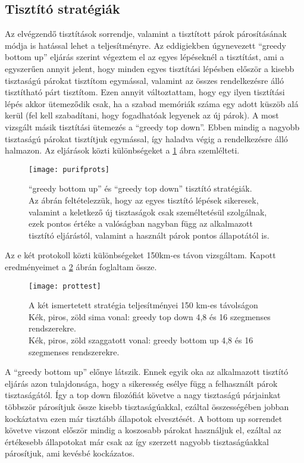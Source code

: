 \subsection{Tisztító stratégiák}
Az elvégzendő tisztítások sorrendje, valamint a tisztított párok párosításának módja is hatással lehet a teljesítményre. Az eddigiekben úgynevezett ``greedy bottom up'' eljárás szerint végeztem el az egyes lépéseknél a tisztítást, ami a egyszerűen annyit jelent, hogy minden egyes tisztítási lépésben először a kisebb tisztaságú párokat tisztítom egymással, valamint az összes rendelkezésre álló tisztítható párt tisztítom. Ezen annyit változtattam, hogy egy ilyen tisztítási lépés akkor ütemeződik csak, ha a szabad memóriák száma egy adott küszöb alá kerül (fel kell szabadítani, hogy fogadhatóak legyenek az új párok). A most vizsgált másik tisztítási ütemezés a ``greedy top down''. Ebben mindig a nagyobb tisztaságú párokat tisztítjuk egymással, így haladva végig a rendelkezésre álló halmazon.
Az eljárások közti különbségeket a \ref{fig:pur1} ábra szemlélteti.
\begin{figure}[H]
\centering
\texttt{[image: purifprots]}
\caption[Tisztító stratégiák]
{``greedy bottom up'' és ``greedy top down'' tisztító stratégiák.\\
Az ábrán feltételezzük, hogy az egyes tisztító lépések sikeresek, valamint a keletkező új tisztaságok csak személtetésül szolgálnak, ezek pontos értéke a valóságban nagyban függ az alkalmazott tisztító eljárástól, valamint a használt párok pontos állapotától is.}
\label{fig:pur1}
\end{figure}
Az e két protokoll közti különbségeket 150km-es távon vizsgáltam.
Kapott eredményeimet a \ref{fig:pur2} ábrán foglaltam össze.
\begin{figure}[H]
\centering
\texttt{[image: prottest]}
\caption[Tisztító stratégiák]
{A két ismertetett stratégia teljesítményei 150 km-es távolságon \\
Kék, piros, zöld sima vonal: greedy top down 4,8 és 16 szegmenses rendszerekre. \\
Kék, piros, zöld szaggatott vonal: greedy bottom up 4,8 és 16 szegmenses rendszerekre.
}
\label{fig:pur2}
\end{figure}
A ``greedy bottom up'' előnye látszik. Ennek egyik oka az alkalmazott tisztító eljárás azon tulajdonsága, hogy a sikeresség esélye függ a felhasznált párok tisztaságától. Így a top down filozófiát követve a nagy tisztaságú párjainkat többször párosítjuk össze kisebb tisztaságúakkal, ezáltal összességében jobban kockáztatva ezen már tisztább állapotok elvesztését. A bottom up sorrendet követve viszont először mindig a koszosabb párokat használjuk el, ezáltal az értékesebb állapotokat már csak az így szerzett nagyobb tisztaságúakkal párosítjuk, ami kevésbé kockázatos.
